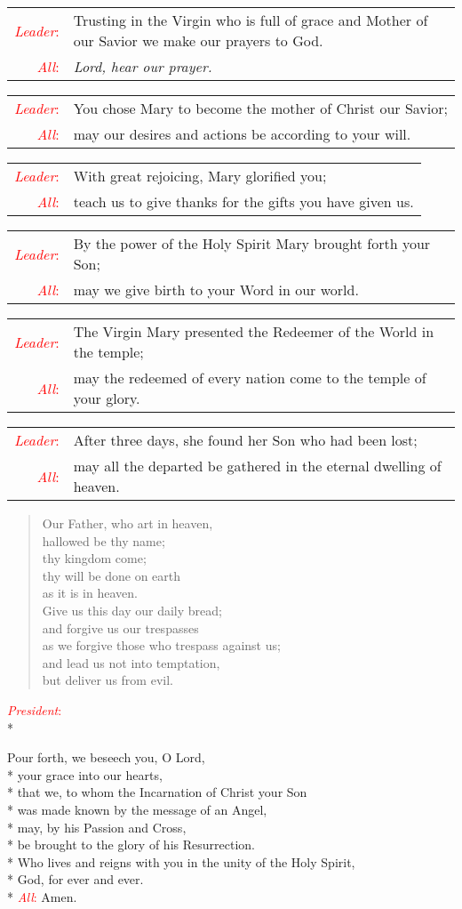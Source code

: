 \documentclass[letterpaper,14pt]{extarticle}
\newcommand{\side}[1]{\flagverse{\textcolor{red}{\textit{#1}}:}}
\newcommand{\sidestar}[1]{\textcolor{red}{\textit{#1}:}}
\newlength{\oldindent}
\newcommand{\antiphon}[2]{
	\setlength{\oldindent}{\vindent}
	\setlength{\vindent}{0em}
	\begin{verse}
	\side{#1} \textbf{#2}
	\end{verse}
	\setlength{\vindent}{\oldindent}
}
\newcommand{\intercession}[2]{
	\begin{tabular}[h]{r p{4.25in}}
		\sidestar{Leader} & #1 \\
		\sidestar{All} & #2
	\end{tabular}}
\begin{document}
\intercession{Trusting in the Virgin who is full of grace and Mother of our Savior we make our prayers to God.}
{\textit{Lord, hear our prayer.}}

\intercession{You chose Mary to become the mother of Christ our Savior;}
{may our desires and actions be according to your will.}

\intercession{With great rejoicing, Mary glorified you;}
{teach us to give thanks for the gifts you have given us.}

\intercession{By the power of the Holy Spirit Mary brought forth your Son;}
{may we give birth to your Word in our world.}

\intercession{The Virgin Mary presented the Redeemer of the World in the temple;}
{may the redeemed of every nation come to the temple of your glory.}

\intercession{After three days, she found her Son who had been lost;}
{may all the departed be gathered in the eternal dwelling of heaven.}

	
\begin{verse}
	\side{All} Our Father, who art in heaven,\\ %
hallowed be thy name; \\
thy kingdom come; \\
thy will be done on earth \\
as it is in heaven. \\
Give us this day our daily bread; \\
and forgive us our trespasses \\
as we forgive those who trespass against us; \\
and lead us not into temptation, \\
but deliver us from evil.
\end{verse}


\sidestar{President}\\*

Pour forth, we beseech you, O Lord, \\*
your grace into our hearts, \\*
that we, to whom the Incarnation of Christ your Son \\*
was made known by the message of an Angel, \\*
may, by his Passion and Cross, \\*
be brought to the glory of his Resurrection. \\*
Who lives and reigns with you in the unity of the Holy Spirit,\\*
God, for ever and ever.\\*
\sidestar{All} Amen.
\end{document}
